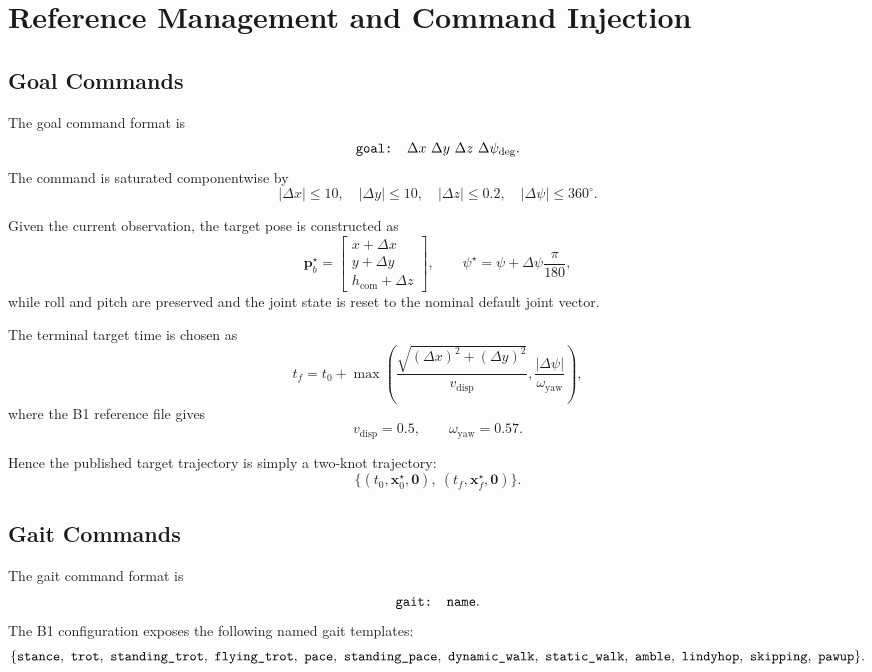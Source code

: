 \documentclass[11pt,a4paper]{article}
\newcommand{\vect}[1]{\bm{#1}}
\begin{document}
\section{Reference Management and Command Injection}
\subsection{Goal Commands}
The goal command format is
\begin{equation}
\text{\texttt{goal: }}\Delta x\ \Delta y\ \Delta z\ \Delta \psi_{\deg}.
\end{equation}
The command is saturated componentwise by
\begin{equation}
|\Delta x| \le 10,\quad
|\Delta y| \le 10,\quad
|\Delta z| \le 0.2,\quad
|\Delta \psi| \le 360^\circ.
\end{equation}

Given the current observation, the target pose is constructed as
\begin{equation}
\vect{p}_b^{\star} =
\begin{bmatrix}
x + \Delta x \\
y + \Delta y \\
h_{\mathrm{com}} + \Delta z
\end{bmatrix},
\qquad
\psi^{\star} = \psi + \Delta \psi \frac{\pi}{180},
\end{equation}
while roll and pitch are preserved and the joint state is reset to the nominal default joint vector.

The terminal target time is chosen as
\begin{equation}
t_f = t_0 + \max\left(
\frac{\sqrt{(\Delta x)^2 + (\Delta y)^2}}{v_{\mathrm{disp}}},
\frac{|\Delta \psi|}{\omega_{\mathrm{yaw}}}
\right),
\end{equation}
where the B1 reference file gives
\begin{equation}
v_{\mathrm{disp}} = 0.5,\qquad
\omega_{\mathrm{yaw}} = 0.57.
\end{equation}

Hence the published target trajectory is simply a two-knot trajectory:
\begin{equation}
\{(t_0,\vect{x}_0^{\star},\vect{0}),\ (t_f,\vect{x}_f^{\star},\vect{0})\}.
\end{equation}

\subsection{Gait Commands}
The gait command format is
\begin{equation}
\text{\texttt{gait: name}}.
\end{equation}
The B1 configuration exposes the following named gait templates:
\begin{equation}
\{
\text{\texttt{stance}},\ \text{\texttt{trot}},\ \text{\texttt{standing\_trot}},\ \text{\texttt{flying\_trot}},\ \text{\texttt{pace}},\ \text{\texttt{standing\_pace}},\ \text{\texttt{dynamic\_walk}},\ \text{\texttt{static\_walk}},\ \text{\texttt{amble}},\ \text{\texttt{lindyhop}},\ \text{\texttt{skipping}},\ \text{\texttt{pawup}}
\}.
\end{equation}
\end{document}
